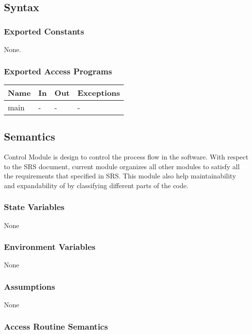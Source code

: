 \documentclass[12pt, titlepage]{article}
\begin{document}
	\subsection{Syntax}
	
	\subsubsection{Exported Constants} None. \subsubsection{Exported Access
		Programs}
	
	\begin{center} \begin{tabular}{p{2cm} p{4cm} p{4cm} p{2cm}} \hline \textbf{Name}
			& \textbf{In} & \textbf{Out} & \textbf{Exceptions} \\ \hline main & - & - & - \\
			\hline \end{tabular} \end{center}
	
	\subsection{Semantics} \progname{} Control Module is design to control the
	process flow in the software. With respect to the SRS document, current module
	organizes all other modules to satisfy all the requirements that specified in
	SRS. This module also help maintainability and expandability of \progname{} by
	classifying different parts of the code.
	
	\subsubsection{State Variables}
	
	None
	
	\subsubsection{Environment Variables}
	
	None
	
	\subsubsection{Assumptions}
	
	None
	
	\subsubsection{Access Routine Semantics}
	
\end{document}
